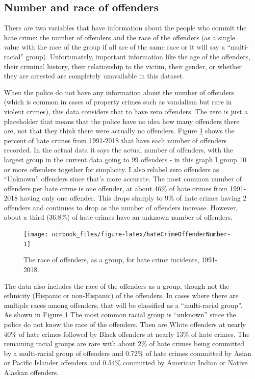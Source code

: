 \documentclass[
  12pt,
  openany]{book}
\begin{document}
\hypertarget{number-and-race-of-offenders}{%
\subsection{Number and race of offenders}\label{number-and-race-of-offenders}}

There are two variables that have information about the people who commit the hate crime: the number of offenders and the race of the offenders (as a single value with the race of the group if all are of the same race or it will say a ``multi-racial'' group). Unfortunately, important information like the age of the offenders, their criminal history, their relationship to the victim, their gender, or whether they are arrested are completely unavailable in this dataset.

When the police do not have any information about the number of offenders (which is common in cases of property crimes such as vandalism but rare in violent crimes), this data considers that to have zero offenders. The zero is just a placeholder that means that the police have no idea how many offenders there are, not that they think there were actually no offenders. Figure \ref{fig:hateCrimeOffenderNumber} shows the percent of hate crimes from 1991-2018 that have each number of offenders recorded. In the actual data it says the actual number of offenders, with the largest group in the current data going to 99 offenders - in this graph I group 10 or more offenders together for simplicity. I also relabel zero offenders as ``Unknown'' offenders since that's more accurate. The most common number of offenders per hate crime is one offender, at about 46\% of hate crimes from 1991-2018 having only one offender. This drops sharply to 9\% of hate crimes having 2 offenders and continues to drop as the number of offenders increase. However, about a third (36.8\%) of hate crimes have an unknown number of offenders.

\begin{figure}

{\centering \texttt{[image: ucrbook\_files/figure-latex/hateCrimeOffenderNumber-1]} 

}

\caption{The race of offenders, as a group, for hate crime incidents, 1991-2018.}\label{fig:hateCrimeOffenderNumber}
\end{figure}

The data also includes the race of the offenders as a group, though not the ethnicity (Hispanic or non-Hispanic) of the offenders. In cases where there are multiple races among offenders, that will be classified as a ``multi-racial group''. As shown in Figure \ref{fig:hateCrimeOffenderNumber} The most common racial group is ``unknown'' since the police do not know the race of the offenders. Then are White offenders at nearly 40\% of hate crimes followed by Black offenders at nearly 13\% of hate crimes. The remaining racial groups are rare with about 2\% of hate crimes being committed by a multi-racial group of offenders and 0.72\% of hate crimes committed by Asian or Pacific Islander offenders and 0.54\% committed by American Indian or Native Alaskan offenders.
\end{document}
